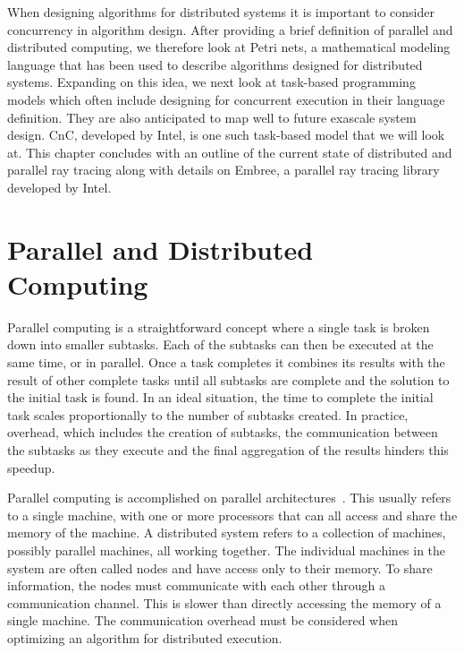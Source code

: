 \label{chpt:previous-work}

When designing algorithms for distributed systems it is important to consider 
concurrency in algorithm design.  After providing a brief definition of parallel
and distributed computing, we therefore look at Petri nets, a mathematical 
modeling language that has been used to describe algorithms designed for 
distributed systems.  Expanding on this idea, we next look at task-based 
programming models which often include designing for concurrent execution in
their language definition.  They are also anticipated to map well to future 
exascale system design.  CnC, developed by Intel, is one such task-based model 
that we will look at.  This chapter concludes with an outline of the current 
state of distributed and parallel ray tracing along with details on Embree, a
parallel ray tracing library developed by Intel.

\section{Parallel and Distributed Computing}
\label{sec:computing}

Parallel computing is a straightforward concept where a single task is broken 
down into smaller subtasks.  Each of the subtasks can then be executed at
the same time, or in parallel.  Once a task completes it combines its results 
with the result of other complete tasks until all subtasks are complete and the
solution to the initial task is found.  In an ideal situation, the time to 
complete the initial task scales proportionally to the number of subtasks 
created.  In practice, overhead, which includes the creation of subtasks, 
the communication between the subtasks as they execute and the final aggregation
of the results hinders this speedup.

Parallel computing is accomplished on parallel
architectures~\cite{book-chalmers}.  This usually refers to a
single machine, with one or more processors that can all access and share the
memory of the machine.  A distributed system refers to a collection of
machines, possibly parallel machines, all working together.  The individual
machines in the system are often called nodes and have access only to their
memory.  To share information, the nodes must communicate with each other
through a communication channel. This is slower than directly accessing the
memory of a single machine.  The communication overhead must be considered when
optimizing an algorithm for distributed execution.

